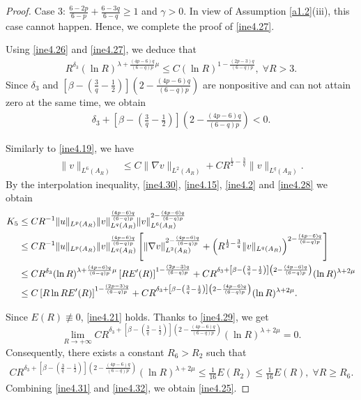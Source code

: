 \documentclass[11pt,reqno]{amsart}
\numberwithin{Thm}{section}
\begin{document}
\begin{proof}
\noindent Case 3: $\frac{6-2p}{6-p} + \frac{6-3q}{6-q}\geq1$ and $\gamma>0$. In view of Assumption \ref{a1.2}(iii), this case cannot happen.
Hence, we complete the proof of \eqref{ine4.27}.


Using \eqref{ine4.26} and \eqref{ine4.27}, we deduce that
\begin{align}\label{ine4.28}
R^{\delta_3}(\ln R)^{\lambda+\frac{(4p-6)q}{(6-q)p}\mu}\leq C(\ln R)^{1-\frac{(2p-3)q}{(6-q)p}},\;\forall R>3.
\end{align}
Since $\delta_3$ and $\left[\beta-\left(\frac{3}{q}-\frac{1}{2}\right)\right]\left(2-\frac{(4p-6)q}{(6-q)p}\right)$ are nonpositive and can not attain zero at the same time,
we obtain
\begin{align}\label{ine4.29}
\delta_3+\left[\beta-\left(\frac{3}{q}-\frac{1}{2}\right)\right]\left(2-\frac{(4p-6)q}{(6-q)p}\right)<0.
\end{align}


Similarly to \eqref{ine4.19}, we have
\begin{align}\label{ine4.30}
\|v\|_{L^6(A_R)}&\leq C\|\nabla v\|_{L^2 (A_R)}+CR^{\frac{1}{2}-\frac{3}{q}}\|v\|_{L^q(A_R)}.
\end{align}
By the interpolation inequality, \eqref{ine4.30}, \eqref{ine4.15}, \eqref{ine4.2} and \eqref{ine4.28}  we obtain
\begin{align}\label{ine4.31}
	K_5 &\leq C R^{-1} \|u\|_{L^p(A_R)} \|v\|_{L^q(A_R)}^\frac{(4p-6)q}{(6-q)p}\|v\|_{L^6(A_R)}^{2-\frac{(4p-6)q}{(6-q)p}}\notag\\
        &\leq C R^{-1} \|u\|_{L^p(A_R)} \|v\|_{L^q(A_R)}^\frac{(4p-6)q}{(6-q)p}\left[\|\nabla v\|_{L^2 (A_R)}^{2-\frac{(4p-6)q}{(6-q)p}}+\left(R^{\frac{1}{2}-\frac{3}{q}}\|v\|_{L^q(A_R)}\right)^{2-\frac{(4p-6)q}{(6-q)p}}\right]\\
        &\leq CR^{\delta_3}(\ln R)^{\lambda+\frac{(4p-6)q}{(6-q)p}\mu}\left[R E'(R) \right]^{1-\frac{(2p-3)q}{(6-q)p}}+CR^{\delta_3+\left[\beta-\left(\frac{3}{q}-\frac{1}{2}\right)\right]\left(2-\frac{(4p-6)q}{(6-q)p}\right)}(\ln R)^{\lambda+2\mu}\notag\\
        &\leq C \left[ R \ln R E'(R) \right]^{1-\frac{(2p-3)q}{(6-q)p}}+CR^{\delta_3+\left[\beta-\left(\frac{3}{q}-\frac{1}{2}\right)\right]\left(2-\frac{(4p-6)q}{(6-q)p}\right)}(\ln R)^{\lambda+2\mu}.\notag
\end{align}


Since $E(R)\not\equiv0$, \eqref{ine4.21} holds. Thanks to \eqref{ine4.29}, we get
$$
\lim\limits_{R\rightarrow+\infty}CR^{\delta_3+\left[\beta-\left(\frac{3}{q}-\frac{1}{2}\right)\right]\left(2-\frac{(4p-6)q}{(6-q)p}\right)}(\ln R)^{\lambda+2\mu}=0.
$$
Consequently, there exists a constant $R_6>R_2$ such that
\begin{align}\label{ine4.32}
CR^{\delta_3+\left[\beta-\left(\frac{3}{q}-\frac{1}{2}\right)\right]\left(2-\frac{(4p-6)q}{(6-q)p}\right)}(\ln R)^{\lambda+2\mu}\leq\frac{1}{16}E(R_2)\leq \frac{1}{16}E(R),\;\forall R\geq R_6.
\end{align}
Combining \eqref{ine4.31} and \eqref{ine4.32}, we obtain \eqref{ine4.25}.
\end{proof}
\end{document}
